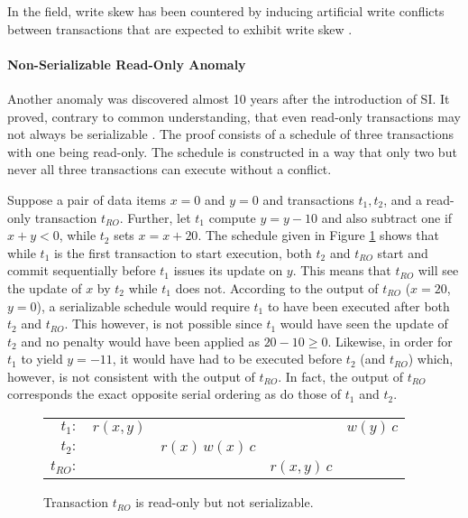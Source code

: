 In the field, write skew has been countered by inducing artificial write
conflicts between transactions that are expected to exhibit write skew
\cite{fekete2005making}.

\paragraph{Non-Serializable Read-Only Anomaly}

Another anomaly was discovered almost 10 years after the introduction of
\ac{SI}. It proved, contrary to common understanding, that even read-only
transactions may not always be serializable \cite{fekete2004read}. The proof
consists of a schedule of three transactions with one being read-only. The
schedule is constructed in a way that only two but never all three
transactions can execute without a conflict.

Suppose a pair of data items $x = 0$ and $y = 0$ and transactions $t_1, t_2$,
and a read-only transaction $t_{RO}$. Further, let $t_1$ compute $y = y - 10$
and also subtract one if $x + y < 0$, while $t_2$ sets $x = x + 20$. The
schedule given in Figure \ref{fig:bad_read_only} shows that while $t_1$ is the
first transaction to start execution, both $t_2$ and $t_{RO}$ start and commit
sequentially before $t_1$ issues its update on $y$. This means that $t_{RO}$
will see the update of $x$ by $t_2$ while $t_1$ does not. According to the
output of $t_{RO}$ ($x = 20$, $y = 0$), a serializable schedule would require
$t_1$ to have been executed after both $t_2$ and $t_{RO}$. This however, is not
possible since $t_1$ would have seen the update of $t_2$ and no penalty would
have been applied as $20 - 10 \geq 0$. Likewise, in order for $t_1$ to yield
$y = -11$, it would have had to be executed before $t_2$ (and $t_{RO}$) which,
however, is not consistent with the output of $t_{RO}$. In fact, the output of
$t_{RO}$ corresponds the exact opposite serial ordering as do those of
$t_1$ and $t_2$.

\begin{figure}[h!]
    \centering
    \begin{tabular}{r c c c c}
    $t_1:$    & $r(x,y)$ &                   &              & $w(y)\, c$ \\
    $t_2:$    &          & $r(x)\, w(x)\, c$ &              &            \\
    $t_{RO}:$ &          &                   & $r(x,y)\, c$ &
    \end{tabular}
    \caption{Transaction $t_{RO}$ is read-only but not serializable.}
    \label{fig:bad_read_only}
\end{figure}


